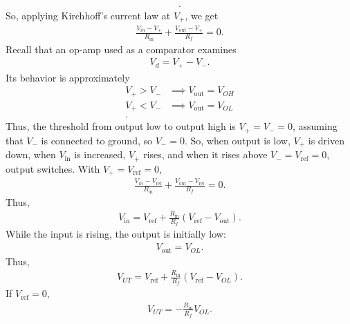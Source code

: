 \documentclass{report}
\begin{document}
\begin{itemize}
\begin{align*}
            .\end{align*}
            So, applying Kirchhoff's current law at $V_{+}$, we get
            \begin{align*}
                 \frac{V_{in} - V_{+}}{R_{\text{in}}} +  \frac{V_{\text{out}} - V_{+}}{R_{f}} = 0
            .\end{align*}
            Recall that an op-amp used as a comparator examines 
            \begin{align*}
                V_{d} = V_{+} - V_{-}
            .\end{align*}
            Its behavior is approximately
            \begin{align*}
                V_{+} > V_{-} &\implies V_{\text{out}} = V_{OH} \\
                V_{+} < V_{-} &\implies V_{\text{out}} = V_{OL} \\
            .\end{align*}
            Thus, the threshold from output low to output high is $V_{+} = V_{-} = 0$, assuming that $V_{-}$ is connected to ground, so $V_{-} = 0$.
            \bigbreak \noindent 
            So, when output is low, $V_{+}$ is driven down, when $V_{\text{in}}$ is increased, $V_{+}$ rises, and when it rises above $V_{-} = V_{\text{ref}}  = 0$, output switches.
            \bigbreak \noindent 
            With $V_{+} = V_{\text{ref}} = 0$,
            \begin{align*}
                 \frac{V_{in} - V_{\text{ref}}}{R_{\text{in}}} +  \frac{V_{\text{out}} - V_{\text{ref}}}{R_{f}} = 0
            .\end{align*}
            Thus,
            \begin{align*}
                V_{\text{in}} = V_{\text{ref}} + \frac{R_{\text{in}}}{R_{f}}(V_{\text{ref}} - V_{\text{out}})
            .\end{align*}
            While the input is rising, the output is initially low:
            \begin{align*}
                V_{\text{out}} = V_{OL}
            .\end{align*}
            Thus,
            \begin{align*}
                V_{UT} = V_{\text{ref}} + \frac{R_{\text{in}}}{R_{f}}(V_{\text{ref}} - V_{OL})
            .\end{align*}
            If $V_{\text{ref}} = 0$,
            \begin{align*}
                V_{UT} = -\frac{R_{\text{in}}}{R_{f}}V_{OL}
            .\end{align*}

\end{itemize}
\end{document}
